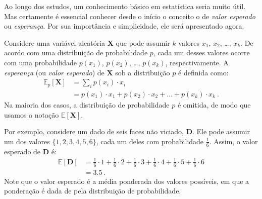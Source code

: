 \documentclass{article}
\newcommand*{\RandomVariable}[1]{\mathbf{#1}}
\newcommand*{\ExpectedValue}{\mathbb{E}}
\begin{document}
        Ao longo dos estudos, um conhecimento básico em estatística seria muito útil. Mas certamente é essencial conhecer desde o início o conceito o de \emph{valor esperado} ou \emph{esperança}. Por sua importância e simplicidade, ele será apresentado agora.
        
        Considere uma variável aleatória $\RandomVariable{X}$ que pode assumir $k$ valores $x_1$, $x_2$, \dots, $x_k$. De acordo com uma distribuição de probabilidade $p$, cada um desses valores ocorre com uma probabilidade $p(x_1)$, $p(x_2)$, \dots, $p(x_k)$, respectivamente. A \emph{esperança} (ou \emph{valor esperado}) de $\RandomVariable{X}$ sob a distribuição $p$ é definida como:
        \begin{equation}
        \begin{aligned}
            \label{eq:state-value}
            \ExpectedValue_p[\RandomVariable{X}] & = \sum_i p(x_i) \cdot x_i \\
            & = p(x_1) \cdot x_1 + p(x_2) \cdot x_2 + \dots + p(x_k) \cdot x_k\ .
        \end{aligned}
        \end{equation}
        Na maioria dos casos, a distribuição de probabilidade $p$ é omitida, de modo que usamos a notação $\ExpectedValue[\RandomVariable{X}]$.

        Por exemplo, considere um dado de seis faces não viciado, $\RandomVariable{D}$. Ele pode assumir um dos valores $\{1, 2, 3, 4, 5, 6\}$, cada um deles com probabilidade $\frac{1}{6}$. Assim, o valor esperado de $\RandomVariable{D}$ é:
        \begin{equation*}
        \begin{aligned}
            \ExpectedValue[\RandomVariable{D}] & = \frac{1}{6} \cdot 1 + \frac{1}{6} \cdot 2 + \frac{1}{6} \cdot 3 + \frac{1}{6} \cdot 4 + \frac{1}{6} \cdot 5 + \frac{1}{6} \cdot 6 \\
            & = 3.5\ .
        \end{aligned}
        \end{equation*}        
        Note que o valor esperado é a média ponderada dos valores possíveis, em que a ponderação é dada de pela distribuição de probabilidade.
    
\end{document}

